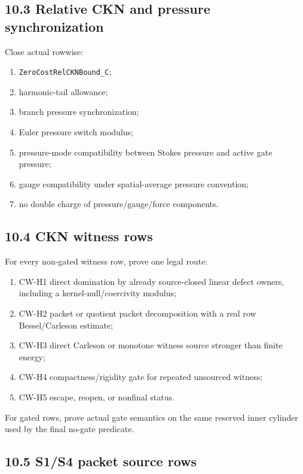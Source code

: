 \documentclass[11pt]{article}
\begin{document}
\subsection*{10.3 Relative CKN and pressure synchronization}

Close actual rowwise:

\begin{enumerate}
\item
  \texttt{ZeroCostRelCKNBound\_C};
\item
  harmonic-tail allowance;
\item
  branch pressure synchronization;
\item
  Euler pressure switch modulus;
\item
  pressure-mode compatibility between Stokes pressure and active gate pressure;
\item
  gauge compatibility under spatial-average pressure convention;
\item
  no double charge of pressure/gauge/force components.
\end{enumerate}

\subsection*{10.4 CKN witness rows}

For every non-gated witness row, prove one legal route:

\begin{enumerate}
\item
  CW-H1 direct domination by already source-closed linear defect owners, including a kernel-null/coercivity modulus;
\item
  CW-H2 packet or quotient packet decomposition with a real row Bessel/Carleson estimate;
\item
  CW-H3 direct Carleson or monotone witness source stronger than finite energy;
\item
  CW-H4 compactness/rigidity gate for repeated unsourced witness;
\item
  CW-H5 escape, reopen, or nonfinal status.
\end{enumerate}

For gated rows, prove actual gate semantics on the same reserved inner cylinder used by the final no-gate predicate.

\subsection*{10.5 S1/S4 packet source rows}
\end{document}
